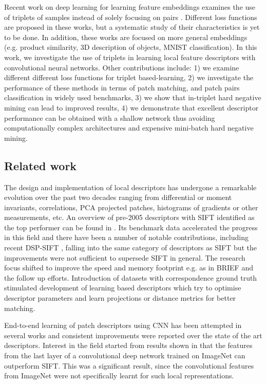 Recent work on deep learning for learning feature embeddings examines
the use of triplets of samples instead of solely focusing on pairs
\cite{DBLP:journals/corr/WangSLRWPCW14,DBLP:journals/corr/HofferA14,wohlhart15}.
Different loss functions are proposed in these works, but a systematic
study of their characteristics is yet to be done. In addition, these
works are focused on more general embeddings (e.g. product similarity,
3D description of objects, MNIST classification). In this work, we
investigate the use of triplets in learning local feature descriptors
with convolutional neural networks. Other contributions include: 1) we
examine different different loss functions for triplet based-learning,
2) we investigate the performance of these methods in terms of patch
matching, and patch pairs classification in widely used benchmarks, 3)
we show that in-triplet hard negative mining can lead to improved
results, 4) we demonstrate that excellent descriptor performance can
be obtained with a shallow network thus avoiding computationally
complex architectures and expensive mini-batch hard negative mining.

\subsection{Related work}
The design and implementation of local descriptors has undergone a
remarkable evolution over the past two decades ranging from
differential or moment invariants, correlations, PCA projected patches, histograms of
gradients or other measurements, etc. An
overview of  pre-2005 descriptors with SIFT
\cite{Lowe:2004:DIF:993451.996342} identified as the top performer can
be found in \cite{schmid2003performance}. 
Its benchmark data accelerated the progress in this field and there
have been a number of notable contributions, including recent DSP-SIFT
\cite{DBLP:journals/corr/DongS14}, falling into the same category of
descriptors as SIFT but the improvements were not sufficient to
supersede SIFT in general. The research focus shifted to
improve the speed and memory footprint e.g. as in BRIEF
\cite{Calonder:2010:BBR:1888089.1888148} and the follow up efforts.
Introduction of datasets with correspondence ground truth \cite{WHB09}
stimulated development of learning based descriptors which try to
optimise descriptor parameters and learn projections or distance
metrics \cite{BHW10,simonyan2014learning} for better matching. 

End-to-end learning of patch descriptors using CNN has been attempted
in several works
\cite{FDB14,ZagoruykoCVPR2015,simo2015deepdesc,Han_2015_CVPR} and
consistent improvements were reported over the state of the art
descriptors.  Interest in the field started from results shown in
\cite{FDB14} that the features from the last layer of a convolutional
deep network trained on ImageNet \cite{ILSVRC15} can outperform
SIFT. This was a significant result, since the convolutional features
from ImageNet were not specifically learnt for such local
representations.

